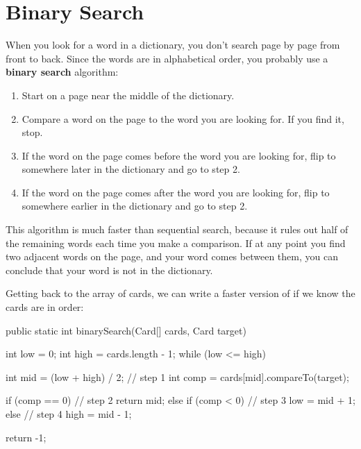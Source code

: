 \section{Binary Search}



When you look for a word in a dictionary, you don't search page by page from front to back.
Since the words are in alphabetical order, you probably use a {\bf binary search} algorithm:

\begin{enumerate}

\item Start on a page near the middle of the dictionary.

\item Compare a word on the page to the word you are looking for.
If you find it, stop.

\item If the word on the page comes before the word you are looking for, flip to somewhere later in the dictionary and go to step 2.

\item If the word on the page comes after the word you are looking for, flip to somewhere earlier in the dictionary and go to step 2.

\end{enumerate}

This algorithm is much faster than sequential search, because it rules out half of the remaining words each time you make a comparison.
If at any point you find two adjacent words on the page, and your word comes between them, you can conclude that your word is not in the dictionary.

Getting back to the array of cards, we can write a faster version of  if we know the cards are in order:

\begin{code}
public static int binarySearch(Card[] cards, Card target) {
    int low = 0;
    int high = cards.length - 1;
    while (low <= high) {
        int mid = (low + high) / 2;                 // step 1
        int comp = cards[mid].compareTo(target);

        if (comp == 0) {                            // step 2
            return mid;
        } else if (comp < 0) {                      // step 3
            low = mid + 1;
        } else {                                    // step 4
            high = mid - 1;
        }
    }
    return -1;
}
\end{code}

